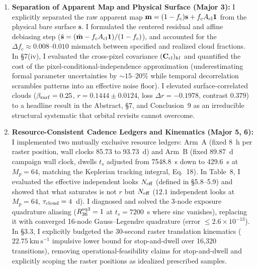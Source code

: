 \documentclass[11pt]{article}
\begin{document}
\begin{enumerate}
    \item \textbf{Separation of Apparent Map and Physical Surface (Major 3):}
    I explicitly separated the raw apparent map $\mathbf{m} = (1-f_c)\mathbf{s} + f_c A_{\rm cl}\mathbf{1}$ from the physical bare surface $\mathbf{s}$. I formulated the centered residual and affine debiasing step ($\hat{\mathbf{s}} = (\hat{\mathbf{m}} - f_c A_{\rm cl}\mathbf{1})/(1-f_c)$), and accounted for the $\Delta f_c \approx 0.008$--$0.010$ mismatch between specified and realized cloud fractions. In §7(iv), I evaluated the cross-pixel covariance $(\mathbf{C}_{\rm cl})_{kl}$ and quantified the cost of the pixel-conditional-independence approximation (underestimating formal parameter uncertainties by $\sim 15$--$20\%$ while temporal decorrelation scrambles patterns into an effective noise floor). I elevated surface-correlated clouds ($\beta_{\rm surf}=0.25$, $r=0.1444 \pm 0.0124$, loss $\Delta r = -0.1978$, contrast $0.379$) to a headline result in the Abstract, §7, and Conclusion~9 as an irreducible structural systematic that orbital revisits cannot overcome.

    \item \textbf{Resource-Consistent Cadence Ledgers and Kinematics (Major 5, 6):}
    I implemented two mutually exclusive resource ledgers: Arm~A (fixed 8~h per raster position, wall clocks 85.73 to 93.73~d) and Arm~B (fixed 89.87~d campaign wall clock, dwells $t_s$ adjusted from 7548.8~s down to 429.6~s at $M_p=64$, matching the Keplerian tracking integral, Eq.~18). In Table~8, I evaluated the effective independent looks $N_{\rm eff}$ (defined in §5.8--5.9) and showed that what saturates is not $r$ but $N_{\rm eff}$ ($12.1$ independent looks at $M_p=64$, $\tau_{\rm cloud}=4$~d). I diagnosed and solved the 3-node exposure quadrature aliasing ($R_{36}^{\rm eq3}=1$ at $t_s=7200$~s where sinc vanishes), replacing it with converged 16-node Gauss--Legendre quadrature (error $\le 2.6\times 10^{-13}$). In §3.3, I explicitly budgeted the 30-second raster translation kinematics ($22.75\ \mathrm{km\,s^{-1}}$ impulsive lower bound for stop-and-dwell over 16,320 transitions), removing operational-feasibility claims for stop-and-dwell and explicitly scoping the raster positions as idealized prescribed samples.


\end{enumerate}
\end{document}
